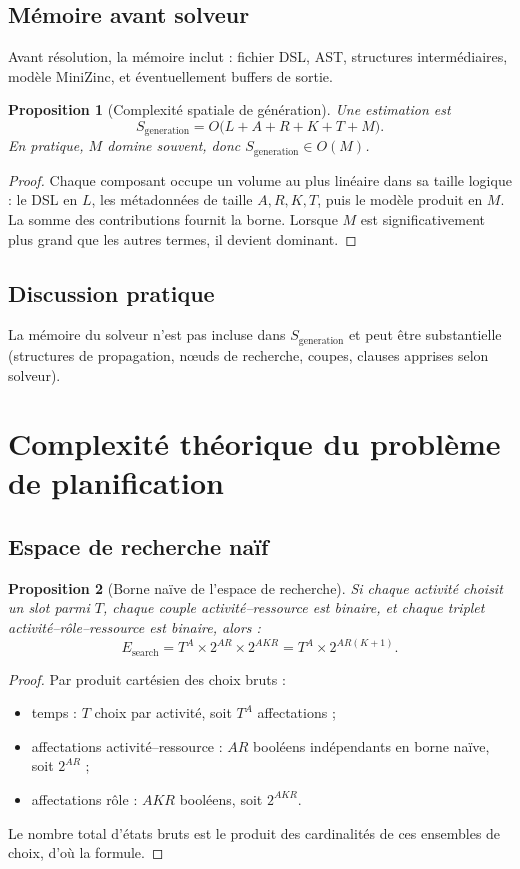 \documentclass[12pt,a4paper]{article}
\newtheorem{proposition}{Proposition}[section]
\begin{document}
\subsection{Mémoire avant solveur}
Avant résolution, la mémoire inclut : fichier DSL, AST, structures intermédiaires, modèle MiniZinc, et éventuellement buffers de sortie.

\begin{proposition}[Complexité spatiale de génération]
Une estimation est
\begin{equation}
S_{\text{generation}} = O\big(L + A + R + K + T + M\big).
\end{equation}
En pratique, $M$ domine souvent, donc $S_{\text{generation}}\in O(M)$.
\end{proposition}
\begin{proof}
Chaque composant occupe un volume au plus linéaire dans sa taille logique : le DSL en $L$, les métadonnées de taille $A,R,K,T$, puis le modèle produit en $M$. La somme des contributions fournit la borne. Lorsque $M$ est significativement plus grand que les autres termes, il devient dominant.
\end{proof}

\subsection{Discussion pratique}
La mémoire du solveur n'est pas incluse dans $S_{\text{generation}}$ et peut être substantielle (structures de propagation, nœuds de recherche, coupes, clauses apprises selon solveur).

\section{Complexité théorique du problème de planification}

\subsection{Espace de recherche naïf}
\begin{proposition}[Borne naïve de l'espace de recherche]
Si chaque activité choisit un slot parmi $T$, chaque couple activité--ressource est binaire, et chaque triplet activité--rôle--ressource est binaire, alors :
\begin{equation}
E_{\text{search}} = T^A\times 2^{AR}\times 2^{AKR} = T^A\times 2^{AR(K+1)}.
\end{equation}
\end{proposition}
\begin{proof}
Par produit cartésien des choix bruts :
\begin{itemize}
  \item temps : $T$ choix par activité, soit $T^A$ affectations ;
  \item affectations activité--ressource : $AR$ booléens indépendants en borne naïve, soit $2^{AR}$ ;
  \item affectations rôle : $AKR$ booléens, soit $2^{AKR}$.
\end{itemize}
Le nombre total d'états bruts est le produit des cardinalités de ces ensembles de choix, d'où la formule.
\end{proof}
\end{document}
